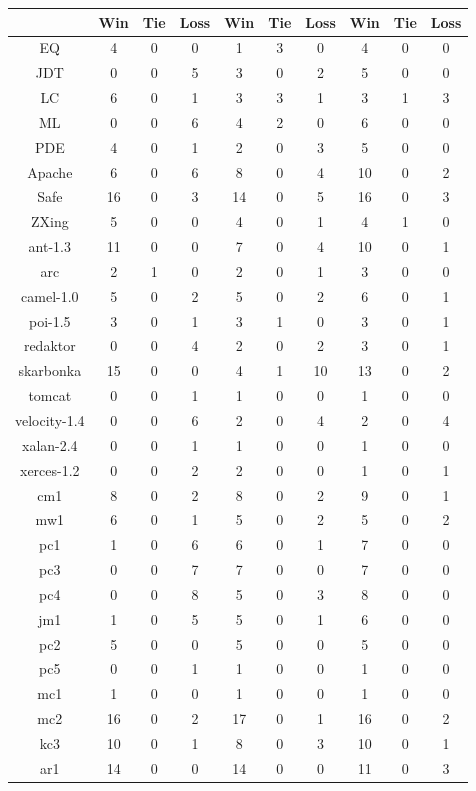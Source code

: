 \begin{table}[!t]
\begin{tabular}{|@{}c@{}||@{}c@{}|@{}c@{}|@{}c@{}||@{}c@{}|@{}c@{}|@{}c@{}||@{}c@{}|@{}c@{}|@{}c@{}|}
& Win & Tie & Loss & Win & Tie & Loss & Win & Tie & Loss \\ \hline \hline
EQ	&4	&0 	&0	&1	&3 	&0	&4	&0 	&0\\ \hline
JDT	&0	&0 	&5	&3	&0 	&2	&5	&0 	&0\\ \hline
LC	&6	&0 	&1	&3	&3 	&1	&3	&1 	&3\\ \hline
ML	&0	&0 	&6	&4	&2 	&0	&6	&0 	&0\\ \hline
PDE	&4	&0 	&1	&2	&0 	&3	&5	&0 	&0\\ \hline
Apache	&6	&0 	&6	&8	&0 	&4	&10	&0 	&2\\ \hline
Safe	&16	&0 	&3	&14	&0 	&5	&16	&0 	&3\\ \hline
ZXing	&5	&0 	&0	&4	&0 	&1	&4	&1 	&0\\ \hline
ant-1.3	&11	&0 	&0	&7	&0 	&4	&10	&0 	&1\\ \hline
arc	&2	&1 	&0	&2	&0 	&1	&3	&0 	&0\\ \hline
camel-1.0	&5	&0 	&2	&5	&0 	&2	&6	&0 	&1\\ \hline
poi-1.5	&3	&0 	&1	&3	&1 	&0	&3	&0 	&1\\ \hline
redaktor	&0	&0 	&4	&2	&0 	&2	&3	&0 	&1\\ \hline
skarbonka	&15	&0 	&0	&4	&1 	&10	&13	&0 	&2\\ \hline
tomcat	&0	&0 	&1	&1	&0 	&0	&1	&0 	&0\\ \hline
velocity-1.4	&0	&0 	&6	&2	&0 	&4	&2	&0 	&4\\ \hline
xalan-2.4	&0	&0 	&1	&1	&0 	&0	&1	&0 	&0\\ \hline
xerces-1.2	&0	&0 	&2	&2	&0 	&0	&1	&0 	&1\\ \hline
cm1	&8	&0 	&2	&8	&0 	&2	&9	&0 	&1\\ \hline
mw1	&6	&0 	&1	&5	&0 	&2	&5	&0 	&2\\ \hline
pc1	&1	&0 	&6	&6	&0 	&1	&7	&0 	&0\\ \hline
pc3	&0	&0 	&7	&7	&0 	&0	&7	&0 	&0\\ \hline
pc4	&0	&0 	&8	&5	&0 	&3	&8	&0 	&0\\ \hline
jm1	&1	&0 	&5	&5	&0 	&1	&6	&0 	&0\\ \hline
pc2	&5	&0 	&0	&5	&0 	&0	&5	&0 	&0\\ \hline
pc5	&0	&0 	&1	&1	&0 	&0	&1	&0 	&0\\ \hline
mc1	&1	&0 	&0	&1	&0 	&0	&1	&0 	&0\\ \hline
mc2	&16	&0 	&2	&17	&0 	&1	&16	&0 	&2\\ \hline
kc3	&10	&0 	&1	&8	&0 	&3	&10	&0 	&1\\ \hline
ar1	&14	&0 	&0	&14	&0 	&0	&11	&0 	&3\\ \hline

\end{tabular}
\end{table}
